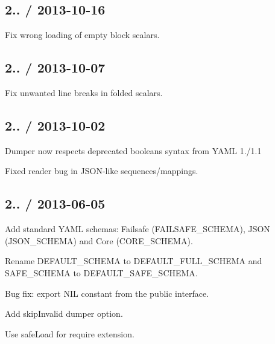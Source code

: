 \subsection*{2.. / 2013-\/10-\/16 }


\begin{DoxyItemize}
\item Fix wrong loading of empty block scalars.
\end{DoxyItemize}

\subsection*{2.. / 2013-\/10-\/07 }


\begin{DoxyItemize}
\item Fix unwanted line breaks in folded scalars.
\end{DoxyItemize}

\subsection*{2.. / 2013-\/10-\/02 }


\begin{DoxyItemize}
\item Dumper now respects deprecated booleans syntax from Y\+A\+ML 1./1.1
\item Fixed reader bug in J\+S\+O\+N-\/like sequences/mappings.
\end{DoxyItemize}

\subsection*{2.. / 2013-\/06-\/05 }


\begin{DoxyItemize}
\item Add standard Y\+A\+ML schemas\+: Failsafe ({\ttfamily F\+A\+I\+L\+S\+A\+F\+E\+\_\+\+S\+C\+H\+E\+MA}), J\+S\+ON ({\ttfamily J\+S\+O\+N\+\_\+\+S\+C\+H\+E\+MA}) and Core ({\ttfamily C\+O\+R\+E\+\_\+\+S\+C\+H\+E\+MA}).
\item Rename {\ttfamily D\+E\+F\+A\+U\+L\+T\+\_\+\+S\+C\+H\+E\+MA} to {\ttfamily D\+E\+F\+A\+U\+L\+T\+\_\+\+F\+U\+L\+L\+\_\+\+S\+C\+H\+E\+MA} and {\ttfamily S\+A\+F\+E\+\_\+\+S\+C\+H\+E\+MA} to {\ttfamily D\+E\+F\+A\+U\+L\+T\+\_\+\+S\+A\+F\+E\+\_\+\+S\+C\+H\+E\+MA}.
\item Bug fix\+: export {\ttfamily N\+IL} constant from the public interface.
\item Add {\ttfamily skip\+Invalid} dumper option.
\item Use {\ttfamily safe\+Load} for {\ttfamily require} extension.
\end{DoxyItemize}

